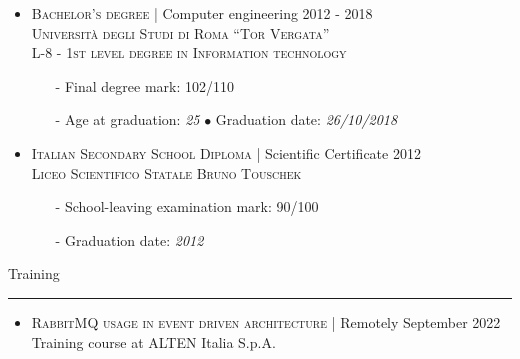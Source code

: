 \documentclass[english,10pt,a4paper]{article}
\newcommand{\CompanyName}[1]{\textsc{{\small #1}}}
\newcommand{\JobTimeRange}[1]{{\scriptsize \textcolor{CvColor!50}{\faCalendar*} \hspace{0.01cm} \textcolor{CvIcon}{#1}}}
\newcommand{\CvBullet}{\hspace{0.05cm} \textcolor{CvColor}{$\bullet$} \hspace{0.05cm}}
\newcommand{\CvSection}[2]{
	\hspace{0.25cm}\textcolor{CvColor!50}{#1} \hspace{0.01cm} \textcolor{CvColor!80}{#2}\\
	\textcolor{CvColor}{\rule[.7\baselineskip]{\textwidth}{1pt}}}
\begin{document}
\begin{paracol}{2}
\begin{tcolorbox}[colback=white, height=\textheight, colframe=white, left=0cm]
\begin{itemize}
	\vspace*{0.2cm}
	
	\item \CompanyName{Bachelor's degree} \textcolor{CvColor}{|} {\scriptsize Computer engineering} \hfill \JobTimeRange{2012 - 2018}\\
	{\scriptsize \textcolor{CvIcon}{\textsc{Università degli Studi di Roma ``Tor Vergata''}}} \\
	{\scriptsize \textcolor{CvIcon}{\textsc{L-8 - 1st level degree in Information technology}}}
	{\scriptsize \begin{itemize}
			\item[-] Final degree mark: \textcolor{CvColor}{102/110}
			\item[-] Age at graduation: \textit{25} \CvBullet Graduation date: \textit{26/10/2018}	
	\end{itemize}}
	
	\vspace*{0.2cm}
	
	\item \CompanyName{Italian Secondary School Diploma} \textcolor{CvColor}{|} {\scriptsize Scientific Certificate} \hfill \JobTimeRange{2012}\\
	{\scriptsize \textcolor{CvIcon}{\textsc{Liceo Scientifico Statale Bruno Touschek}}} 
	{\scriptsize \begin{itemize}
			\item[-] School-leaving examination mark: \textcolor{CvColor}{90/100}
			\item[-] Graduation date: \textit{2012}
	\end{itemize}}
	
\end{itemize}	
	
		
\vspace{0.3cm}	
\CvSection{\faBook}{Training}

\begin{itemize}
	
	\item \CompanyName{RabbitMQ usage in event driven architecture} \textcolor{CvColor}{|} {\scriptsize Remotely} \hfill \JobTimeRange{September 2022}\\
	{\scriptsize \textcolor{CvIcon}{Training course at ALTEN Italia S.p.A.}} 
\end{itemize}


\end{tcolorbox}
\end{paracol}
\end{document}
